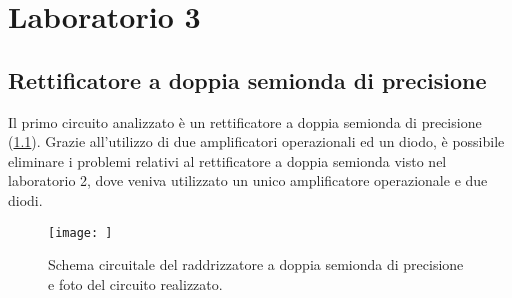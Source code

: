 \chapter{Laboratorio 3}

\section{Rettificatore a doppia semionda di precisione}
Il primo circuito analizzato è un rettificatore a doppia semionda di precisione (\Fig\ref{fig:circuito_1}). Grazie all'utilizzo di due amplificatori operazionali ed un diodo, è possibile eliminare i problemi relativi al rettificatore a doppia semionda visto nel laboratorio 2, dove veniva utilizzato un unico amplificatore operazionale e due diodi. 

\begin{figure}[h]
	\centering
	\begin{minipage}{.45\textwidth}
	\end{minipage}\qquad
	\begin{minipage}{.48\textwidth}
		\texttt{[image: ]}
	\end{minipage}
	\caption{Schema circuitale del raddrizzatore a doppia semionda di precisione e foto del circuito realizzato.}
	\label{fig:circuito_1}
\end{figure}

